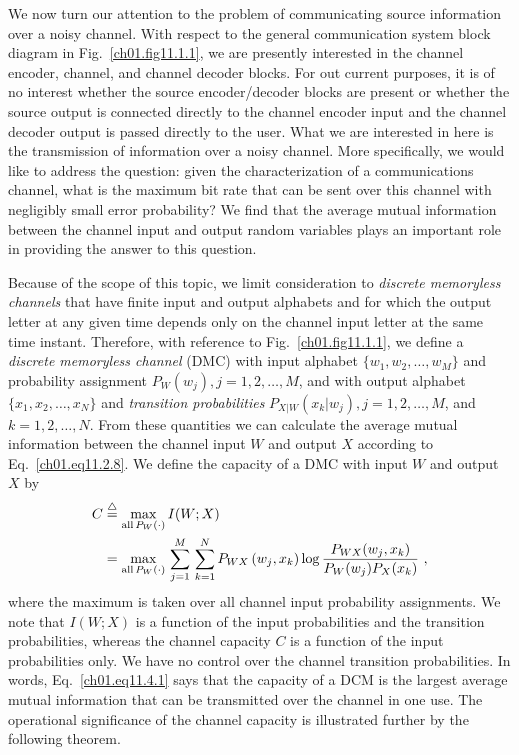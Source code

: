 We now turn our attention to the problem of communicating source information
over a noisy channel. With respect to the general communication system
block diagram in Fig.~\ref{ch01.fig11.1.1}, we are presently interested in
the channel encoder,
channel, and channel decoder blocks. For out current purposes, it is of no
interest whether the source encoder/decoder blocks are present or whether
the source output is connected directly to the channel encoder input and the
channel decoder output is passed directly to the user. What we are
interested in
here is the transmission of information over a noisy channel.
More specifically,
we would like to address the question: given the characterization of a
communications
channel, what is the maximum bit rate that can be sent over this
channel with negligibly small error probability? We find that the average
mutual
information between the channel input and output random variables plays an
important role in providing the answer to this question.

Because of the scope of this topic, we limit consideration to
\textit{discrete memoryless channels}
that have finite input and output alphabets and for which the
output letter at any given time depends only on the channel input letter at
the same time instant. Therefore, with reference to Fig.~\ref{ch01.fig11.1.1},
we define a \textit{discrete memoryless channel} (DMC) with input alphabet
$\{ w_1, w_2, \dots, w_M \} $ and
probability assignment $P_W(w_j), j = 1,2, \dots, M$, and with output alphabet
$ \{ x_1, x_2, \dots, x_N \} $ and \textit{transition probabilities}
$ P_{X|W} (x_k | w_j), j = 1,2, \dots, M $, and
$ k = 1, 2, \dots, N $.
From these quantities we can calculate the average mutual
information between the channel input $W$ and output $X$ according to
Eq.~\eqref{ch01.eq11.2.8}. We define the capacity of a DMC with input $W$
and output $X$  by
\begin{align}
 C \displaystyle & \stackrel{\triangle}{=}
 \max_{\textrm{all} \, P_W (\cdot)} I(W;X)
\notag\\
 \displaystyle &=
 \max_{\textrm{all} \, P_W (\cdot)}\,
 \sum^M_{j=1}\, \sum^N_{k=1} P_{WX} \left( w_j, x_k \right) \log
 \frac{P_{WX} (w_j, x_k)}{P_W (w_j) P_X (x_k)}~,
\label{ch01.eq11.4.1}
\end{align}
where the maximum is taken over all channel input probability assignments.
We note that $I(W;X)$ is a function of the input probabilities and the
transition
probabilities, whereas the channel capacity $C$ is a function of the input
probabilities only. We have no control over the channel transition
probabilities. In
words, Eq.~\eqref{ch01.eq11.4.1} says that the capacity of a DCM is
the largest average mutual
information that can be transmitted over the channel in one use. The
operational significance of the channel capacity is illustrated further by
the following theorem.

